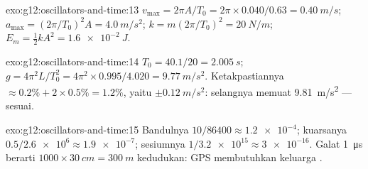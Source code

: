 \begin{solution}{exo:g12:oscillators-and-time:13}
$v_{\max} = 2\pi A/T_0 = 2\pi \times 0.040/0.63 = \qty{0.40}{m/s}$;
$a_{\max} = (2\pi/T_0)^2 A = \qty{4.0}{m/s^2}$; $k = m(2\pi/T_0)^2
= \qty{20}{N/m}$; $E_m = \tfrac12 kA^2 = \qty{1.6e-2}{J}$.
\end{solution}

\begin{solution}{exo:g12:oscillators-and-time:14}
$T_0 = 40.1/20 = \qty{2.005}{s}$; $g = 4\pi^2 L/T_0^2 = 4\pi^2
\times 0.995/4.020 = \qty{9.77}{m/s^2}$. Ketakpastiannya $\approx 0.2\%
+ 2 \times 0.5\% = 1.2\%$, yaitu $\pm\qty{0.12}{m/s^2}$: selangnya
memuat \qty{9.81}{m/s^2} --- sesuai.
\end{solution}

\begin{solution}{exo:g12:oscillators-and-time:15}
Bandulnya $10/86400 \approx \num{1.2e-4}$; kuarsanya $0.5/\num{2.6e6}
\approx \num{1.9e-7}$; sesiumnya $1/\num{3.2e15} \approx \num{3e-16}$.
Galat \qty{1}{\micro s} berarti $\num{1000} \times \qty{30}{cm} =
\qty{300}{m}$ kedudukan: GPS membutuhkan keluarga .
\end{solution}

